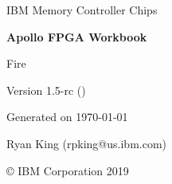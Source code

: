 \hypersetup{pageanchor=false}
\begin{titlepage}
  \centering
  \vspace*{5cm}
  \Large{
    IBM Memory Controller Chips
  }\par
  \Huge{
    \textbf{Apollo FPGA Workbook}
  }\par
  \huge{
    Fire
  }\par
  \Large{
    Version 1.5-rc (\gitversion)
  }\par
  \normalsize{
    Generated on \today\par
    Ryan King (rpking@us.ibm.com)
  }\par
  \vfill
  \copyright \hspace{1mm} IBM Corporation 2019
  \thispagestyle{empty}
\end{titlepage}

\addtocounter{page}{1}

\hypersetup{pageanchor=true}
